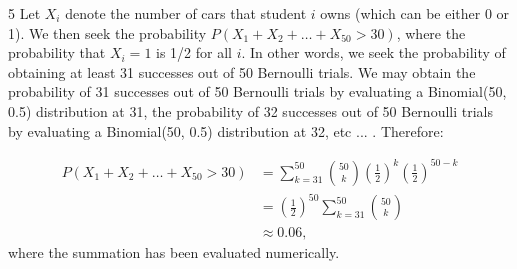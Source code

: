 \begin{problem} {5} Let $X_i$ denote the number of cars that student $i$ owns (which can be either 0 or 1).  We then seek the probability $P(X_1+X_2 +\ldots +X_{50}>30)$, where the probability that $X_i =1$ is 1/2 for all $i$.  In other words, we seek the probability of obtaining at least 31 successes out of 50 Bernoulli trials.  We may obtain the probability of 31 successes out of 50 Bernoulli trials by evaluating a Binomial(50, 0.5) distribution at 31, the probability of 32 successes out of 50 Bernoulli trials by evaluating a Binomial(50, 0.5) distribution at 32, etc ... . Therefore:

\begin{align*}
P(X_1+X_2 +\ldots +X_{50}>30) &= \sum_{k=31}^{50}\binom{50}{k}\left(\frac{1}{2}\right)^k\left(\frac{1}{2}\right)^{50-k} \\
& = \left(\frac{1}{2}\right)^{50} \sum_{k=31}^{50}\binom{50}{k} \\
& \approx 0.06,
\end{align*}
where the summation has been evaluated numerically.

\end{problem}

